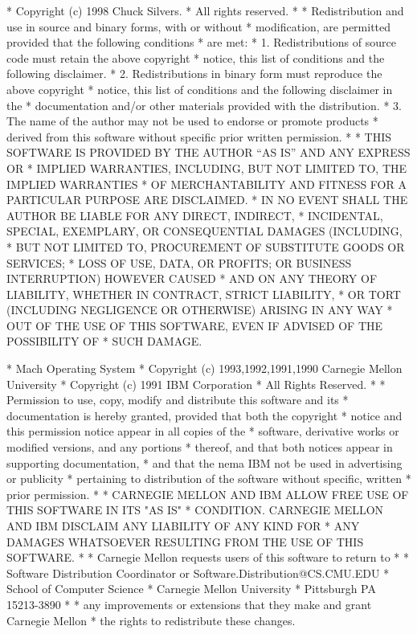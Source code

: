 \begin{copyrightEnv}
 * Copyright (c) 1998 Chuck Silvers.
 * All rights reserved.
 *
 * Redistribution and use in source and binary forms, with or without
 * modification, are permitted provided that the following conditions
 * are met:
 * 1. Redistributions of source code must retain the above copyright
 *    notice, this list of conditions and the following disclaimer.
 * 2. Redistributions in binary form must reproduce the above copyright
 *    notice, this list of conditions and the following disclaimer in the
 *    documentation and/or other materials provided with the distribution.
 * 3. The name of the author may not be used to endorse or promote products
 *    derived from this software without specific prior written permission.
 *
 * THIS SOFTWARE IS PROVIDED BY THE AUTHOR ``AS IS'' AND ANY EXPRESS OR
 * IMPLIED WARRANTIES, INCLUDING, BUT NOT LIMITED TO, THE IMPLIED WARRANTIES
 * OF MERCHANTABILITY AND FITNESS FOR A PARTICULAR PURPOSE ARE DISCLAIMED.
 * IN NO EVENT SHALL THE AUTHOR BE LIABLE FOR ANY DIRECT, INDIRECT,
 * INCIDENTAL, SPECIAL, EXEMPLARY, OR CONSEQUENTIAL DAMAGES (INCLUDING,
 * BUT NOT LIMITED TO, PROCUREMENT OF SUBSTITUTE GOODS OR SERVICES;
 * LOSS OF USE, DATA, OR PROFITS; OR BUSINESS INTERRUPTION) HOWEVER CAUSED
 * AND ON ANY THEORY OF LIABILITY, WHETHER IN CONTRACT, STRICT LIABILITY,
 * OR TORT (INCLUDING NEGLIGENCE OR OTHERWISE) ARISING IN ANY WAY
 * OUT OF THE USE OF THIS SOFTWARE, EVEN IF ADVISED OF THE POSSIBILITY OF
 * SUCH DAMAGE.
\end{copyrightEnv}

\begin{copyrightEnv}
 * Mach Operating System
 * Copyright (c) 1993,1992,1991,1990 Carnegie Mellon University
 * Copyright (c) 1991 IBM Corporation
 * All Rights Reserved.
 *
 * Permission to use, copy, modify and distribute this software and its
 * documentation is hereby granted, provided that both the copyright
 * notice and this permission notice appear in all copies of the
 * software, derivative works or modified versions, and any portions
 * thereof, and that both notices appear in supporting documentation,
 * and that the nema IBM not be used in advertising or publicity
 * pertaining to distribution of the software without specific, written
 * prior permission.
 *
 * CARNEGIE MELLON AND IBM ALLOW FREE USE OF THIS SOFTWARE IN ITS "AS IS"
 * CONDITION.  CARNEGIE MELLON AND IBM DISCLAIM ANY LIABILITY OF ANY KIND FOR
 * ANY DAMAGES WHATSOEVER RESULTING FROM THE USE OF THIS SOFTWARE.
 *
 * Carnegie Mellon requests users of this software to return to
 *
 *  Software Distribution Coordinator  or  Software.Distribution@CS.CMU.EDU
 *  School of Computer Science
 *  Carnegie Mellon University
 *  Pittsburgh PA 15213-3890
 *
 * any improvements or extensions that they make and grant Carnegie Mellon
 * the rights to redistribute these changes.
\end{copyrightEnv}

\onecolumn
